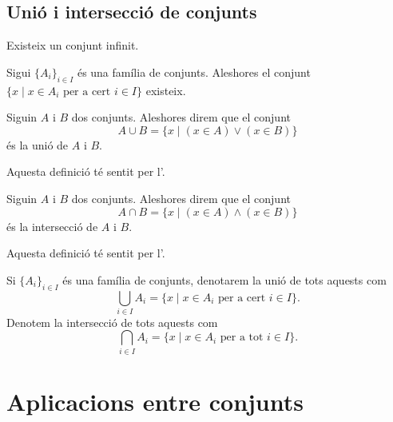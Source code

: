\documentclass[../../Main.tex]{subfiles}
\begin{document}
	\subsection{Unió i intersecció de conjunts}
	\begin{axiom}
		Existeix un conjunt infinit.
	\end{axiom}
	\begin{axiom}
		\label{axiom:axioma de la unió}
		Sigui \(\{A_{i}\}_{i\in I}\) és una família de conjunts. Aleshores el conjunt \(\{x\mid x\in A_{i}\text{ per a cert }i\in I\}\) existeix.
	\end{axiom}
	\begin{definition}
		\label{def:unió de conjunts}
		Siguin \(A\) i \(B\) dos conjunts. Aleshores direm que el conjunt
		\[A\cup B=\{x\mid(x\in A)\lor(x\in B)\}\]
		és la unió de \(A\) i \(B\).
		
		Aquesta definició té sentit per l'.
	\end{definition}
	\begin{definition}
		\label{def:intersecció de conjunts}
		Siguin \(A\) i \(B\) dos conjunts. Aleshores direm que el conjunt
		\[A\cap B=\{x\mid(x\in A)\land(x\in B)\}\]
		és la intersecció de \(A\) i \(B\).
		
		Aquesta definició té sentit per l'.
	\end{definition}
	\begin{notation}
		Si \(\{A_{i}\}_{i\in I}\) és una família de conjunts, denotarem la unió de tots aquests com
		\[\bigcup_{i\in I}A_{i}=\{x\mid x\in A_{i}\text{ per a cert }i\in I\}.\]
		Denotem la intersecció de tots aquests com
		\[\bigcap_{i\in I}A_{i}=\{x\mid x\in A_{i}\text{ per a tot }i\in I\}.\]
	\end{notation}
\section{Aplicacions entre conjunts}
\end{document}
